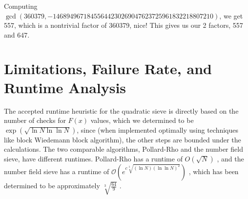 \documentclass[11pt,reqno]{amsart}
\theoremstyle{definition}
\begin{document}
Computing $\gcd(360379, -14689496718455644230269047623725961832218807210)$, we get 557, which is a nontrivial factor of 360379, nice! This gives us our 2 factors, 557 and 647. 


\section{Limitations, Failure Rate, and Runtime Analysis}
\label{sec:analysis}



The accepted runtime heuristic for the quadratic sieve is directly based on the number of checks for $F(x)$ values, which we determined to be $\exp(\sqrt{\ln N \ln \ln N})$, since (when implemented optimally using techniques like block Wiedemann block algorithm), the other steps are bounded under the calculations. The two comparable algorithms, Pollard-Rho and the number field sieve, have different runtimes. Pollard-Rho has a runtime of $O(\sqrt{N})$ \cite{sutherland2007order}, and the number field sieve has a runtime of $\mathcal{O}(e^{c\sqrt[3]{(\ln N)(\ln \ln N)^{2}}})$ \cite{silverman2008introduction}, which has been determined to be approximately $\sqrt[3]{\frac{64}{9}}$ \cite{buhler1993factoring}.
\end{document}
